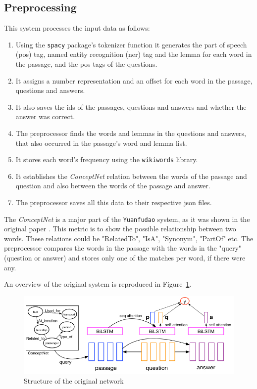 
\subsection{Preprocessing}
This system processes the input data as follows:

\begin{enumerate}
	\item Using the \texttt{spacy} package's tokenizer function it generates the part of speech (pos) tag, named entity recognition (ner) tag and the lemma for each word in the passage, and the pos tags of the questions.
	\item It assigns a number representation and an offset for each word in the passage, questions and answers.
	\item It also saves the ids of the passages, questions and answers and whether the answer was correct.
	\item The preprocessor finds the words and lemmas in the questions and answers, that also occurred in the passage's word and lemma list. 
	\item It stores each word's frequency using the \texttt{wikiwords} library.
	\item It  establishes the \textit{ConceptNet} relation between the words of the passage and question and also between the words of the passage and answer.
	\item The preprocessor saves all this data to their respective json files.
\end{enumerate}


The \textit{ConceptNet} is a major part of the \texttt{Yuanfudao} system, as it was shown in the original paper \cite{Wang:2018}. This metric is to show the possible relationship between two words. These relations could be "RelatedTo", "IsA", "Synonym", "PartOf" etc. The preprocessor compares the words in the passage with the words in the "query" (question or answer) and stores only one of the matches per word, if there were any.

An overview of the original system is reproduced in Figure~\ref{fig:dnn}.
\begin{figure}[h!]
	\centering
	\includegraphics[scale=0.4]{TriAN.jpg}
	\caption{Structure of the original network \cite{Wang:2018}}
	\label{fig:dnn}
\end{figure}

